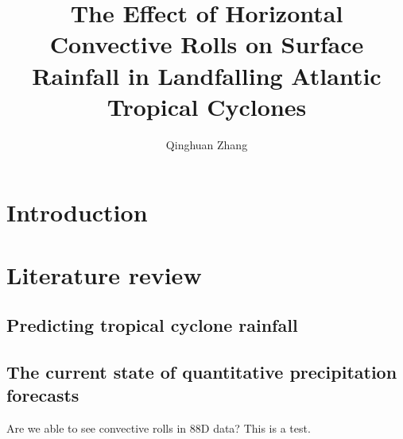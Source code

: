 \documentclass[12pt]{article}
\author{Qinghuan Zhang}
\title{The Effect of Horizontal Convective Rolls on Surface Rainfall in Landfalling Atlantic Tropical Cyclones}
\begin{document}
\maketitle


\section{Introduction}

\section{Literature review}

\subsection{Predicting tropical cyclone rainfall} 

\subsection{The current state of quantitative precipitation forecasts}

Are we able to see convective rolls in 88D data?
This is a test.
\end{document}
